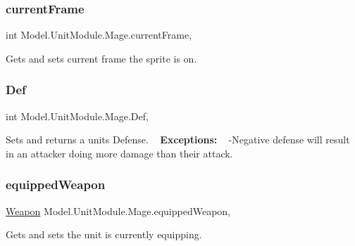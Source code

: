 \subsubsection{\texorpdfstring{current\+Frame}{currentFrame}}
{\footnotesize\ttfamily int Model.\+Unit\+Module.\+Mage.\+current\+Frame\hspace{0.3cm}{\ttfamily [get]}, {\ttfamily [set]}}

Gets and sets current frame the sprite is on. \hypertarget{class_model_1_1_unit_module_1_1_mage_ab656a61ced3728b765d4239969484422}{}\label{class_model_1_1_unit_module_1_1_mage_ab656a61ced3728b765d4239969484422} 
\subsubsection{\texorpdfstring{Def}{Def}}
{\footnotesize\ttfamily int Model.\+Unit\+Module.\+Mage.\+Def\hspace{0.3cm}{\ttfamily [get]}, {\ttfamily [set]}}

Sets and returns a unit\textquotesingle{}s Defense. ~\newline
 {\bfseries Exceptions\+:} ~\newline
 -\/\+Negative defense will result in an attacker doing more damage than their attack. \hypertarget{class_model_1_1_unit_module_1_1_mage_abf1f6f69bfaea68af1cee7f5a159221a}{}\label{class_model_1_1_unit_module_1_1_mage_abf1f6f69bfaea68af1cee7f5a159221a} 
\subsubsection{\texorpdfstring{equipped\+Weapon}{equippedWeapon}}
{\footnotesize\ttfamily \hyperlink{interface_model_1_1_weapon_module_1_1_weapon}{Weapon} Model.\+Unit\+Module.\+Mage.\+equipped\+Weapon\hspace{0.3cm}{\ttfamily [get]}, {\ttfamily [set]}}

Gets and sets the unit is currently equipping. \hypertarget{class_model_1_1_unit_module_1_1_mage_a6a68c5f76a92eb24bb171f740a99e681}{}\label{class_model_1_1_unit_module_1_1_mage_a6a68c5f76a92eb24bb171f740a99e681} 
